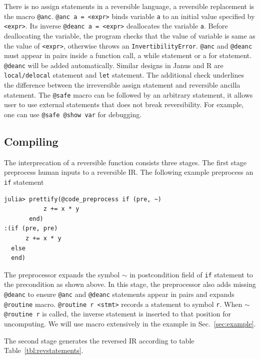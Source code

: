 \documentclass[aps,twocolumn,longbibliography,english,superscriptaddress]{revtex4-1}
\newcommand{\<}{\langle}
\renewcommand{\>}{\rangle}
\newcommand{\Tbl}[1]{Table~\ref{#1}}
\newcommand{\Sec}[1]{Sec.~\ref{#1}}
\theoremstyle{definition}\newtheorem{definition}{\textit{Definition}}
\begin{document}
    There is no assign statements in a reversible language, a reversible replacement is the macro \texttt{@anc}. \texttt{@anc a = <expr>} binds variable \texttt{a} to an initial value specified by \texttt{<expr>}. Its inverse \texttt{@deanc a = <expr>} deallocates the variable \texttt{a}. Before deallocating the variable, the program checks that the value of variable is same as the value of \texttt{<expr>}, otherwise throws an \texttt{InvertibilityError}. \texttt{@anc} and \texttt{@deanc} must appear in pairs inside a function call, a while statement or a for statement.
    \texttt{@deanc} will be added automatically. Similar designs in Janus and R are \texttt{local/delocal} statement and \texttt{let} statement.
    The additional check underlines the difference between the irreversible assign statement and reversible ancilla statement.
The \texttt{@safe} macro can be followed by an arbitrary statement, it allows user to use external statements that does not break reversibility.
For example, one can use \texttt{@safe @show var} for debugging.

\subsection{Compiling}
The interprecation of a reversible function consists three stages.
The first stage preprocess human inputs to a reversible IR.
The following example preprocess an \texttt{if} statement

\begin{minipage}{.44\textwidth}
\begin{lstlisting}
julia> prettify(@code_preprocess if (pre, ~)
           z += x * y
       end)
:(if (pre, pre)
      z += x * y
  else
  end)
\end{lstlisting}
\end{minipage}

The preprocessor expands the symbol \texttt{$\sim$} in postcondition field of \texttt{if} statement to the precondition as shown above. In this stage, the preprocessor also adds missing \texttt{@deanc} to ensure \texttt{@anc} and \texttt{@deanc} statements appear in pairs and  expands \texttt{@routine} macro.
\texttt{@routine r <stmt>} records a statement to symbol \texttt{r}. When \texttt{$\sim$@routine r} is called, the inverse statement is inserted to that position for uncomputing. We will use macro extensively in the example in \Sec{sec:example}.

The second stage generates the reversed IR according to table \Tbl{tbl:revstatements}.
\end{document}
